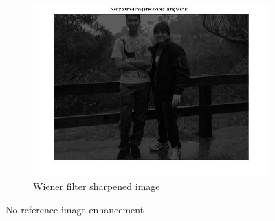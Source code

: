 \begin{figure}
\begin{subfigure}[b]{0.4\textwidth}
        \end{subfigure}
        \begin{subfigure}[b]{0.4\textwidth}
                \centering
                \includegraphics[width=\textwidth]{sharp_personal.jpg}
                \caption{Wiener filter sharpened image} 
        \end{subfigure}
\caption{No reference image enhancement}
\end{figure}

\newpage